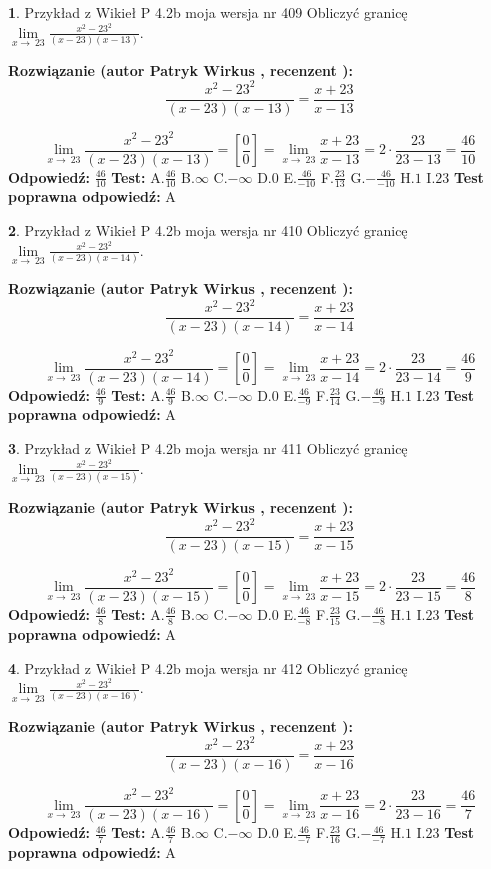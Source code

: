 \documentclass[12pt, a4paper]{article}
\theoremstyle{definition} %
\newtheorem{zad}{}
\newcommand{\zadStart}[1]{\begin{zad}#1\newline}
\newcommand{\zadStop}{\end{zad}}
\newcommand{\rozwStart}[2]{\noindent \textbf{Rozwiązanie (autor #1 , recenzent #2): }\newline}
\newcommand{\rozwStop}{\newline}
\newcommand{\odpStart}{\noindent \textbf{Odpowiedź:}\newline}
\newcommand{\odpStop}{\newline}
\newcommand{\testStart}{\noindent \textbf{Test:}\newline}
\newcommand{\testStop}{\newline}
\newcommand{\kluczStart}{\noindent \textbf{Test poprawna odpowiedź:}\newline}
\newcommand{\kluczStop}{\newline}
\begin{document}
\zadStart{Przykład z Wikieł P 4.2b moja wersja nr 409}
Obliczyć granicę $\lim\limits_{x\to\ 23}\frac{x^{2}-23^{2}}{(x-23)(x-13)}$.
\zadStop
\rozwStart{Patryk Wirkus}{}
$$\frac{x^{2}-23^{2}}{(x-23)(x-13)}=\frac{x+23}{x-13}$$

$$\lim\limits_{x\to\ 23}\frac{x^{2}-23^{2}}{(x-23)(x-13)}=[\frac{0}{0}]=\lim\limits_{x\to\ 23}\frac{x+23}{x-13}=2 \cdot \frac{23}{23-13} = \frac{46}{10}$$
\rozwStop
\odpStart
$\frac{46}{10}$
\odpStop
\testStart
A.$\frac{46}{10}$
B.$\infty$
C.$-\infty$
D.$0$
E.$\frac{46}{-10}$
F.$\frac{23}{13}$
G.$-\frac{46}{-10}$
H.$1$
I.$23$
\testStop
\kluczStart
A
\kluczStop



\zadStart{Przykład z Wikieł P 4.2b moja wersja nr 410}
Obliczyć granicę $\lim\limits_{x\to\ 23}\frac{x^{2}-23^{2}}{(x-23)(x-14)}$.
\zadStop
\rozwStart{Patryk Wirkus}{}
$$\frac{x^{2}-23^{2}}{(x-23)(x-14)}=\frac{x+23}{x-14}$$

$$\lim\limits_{x\to\ 23}\frac{x^{2}-23^{2}}{(x-23)(x-14)}=[\frac{0}{0}]=\lim\limits_{x\to\ 23}\frac{x+23}{x-14}=2 \cdot \frac{23}{23-14} = \frac{46}{9}$$
\rozwStop
\odpStart
$\frac{46}{9}$
\odpStop
\testStart
A.$\frac{46}{9}$
B.$\infty$
C.$-\infty$
D.$0$
E.$\frac{46}{-9}$
F.$\frac{23}{14}$
G.$-\frac{46}{-9}$
H.$1$
I.$23$
\testStop
\kluczStart
A
\kluczStop



\zadStart{Przykład z Wikieł P 4.2b moja wersja nr 411}
Obliczyć granicę $\lim\limits_{x\to\ 23}\frac{x^{2}-23^{2}}{(x-23)(x-15)}$.
\zadStop
\rozwStart{Patryk Wirkus}{}
$$\frac{x^{2}-23^{2}}{(x-23)(x-15)}=\frac{x+23}{x-15}$$

$$\lim\limits_{x\to\ 23}\frac{x^{2}-23^{2}}{(x-23)(x-15)}=[\frac{0}{0}]=\lim\limits_{x\to\ 23}\frac{x+23}{x-15}=2 \cdot \frac{23}{23-15} = \frac{46}{8}$$
\rozwStop
\odpStart
$\frac{46}{8}$
\odpStop
\testStart
A.$\frac{46}{8}$
B.$\infty$
C.$-\infty$
D.$0$
E.$\frac{46}{-8}$
F.$\frac{23}{15}$
G.$-\frac{46}{-8}$
H.$1$
I.$23$
\testStop
\kluczStart
A
\kluczStop



\zadStart{Przykład z Wikieł P 4.2b moja wersja nr 412}
Obliczyć granicę $\lim\limits_{x\to\ 23}\frac{x^{2}-23^{2}}{(x-23)(x-16)}$.
\zadStop
\rozwStart{Patryk Wirkus}{}
$$\frac{x^{2}-23^{2}}{(x-23)(x-16)}=\frac{x+23}{x-16}$$

$$\lim\limits_{x\to\ 23}\frac{x^{2}-23^{2}}{(x-23)(x-16)}=[\frac{0}{0}]=\lim\limits_{x\to\ 23}\frac{x+23}{x-16}=2 \cdot \frac{23}{23-16} = \frac{46}{7}$$
\rozwStop
\odpStart
$\frac{46}{7}$
\odpStop
\testStart
A.$\frac{46}{7}$
B.$\infty$
C.$-\infty$
D.$0$
E.$\frac{46}{-7}$
F.$\frac{23}{16}$
G.$-\frac{46}{-7}$
H.$1$
I.$23$
\testStop
\kluczStart
A
\kluczStop
\end{document}
